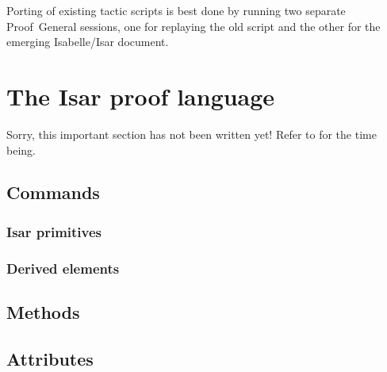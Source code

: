 Porting of existing tactic scripts is best done by running two separate
Proof~General sessions, one for replaying the old script and the other for the
emerging Isabelle/Isar document.


\section{The Isar proof language}

Sorry, this important section has not been written yet!  Refer to
\cite{Wenzel:1999:TPHOL} for the time being.

\subsection{Commands}

\subsubsection{Isar primitives}

\subsubsection{Derived elements}


\subsection{Methods}

\subsection{Attributes}

